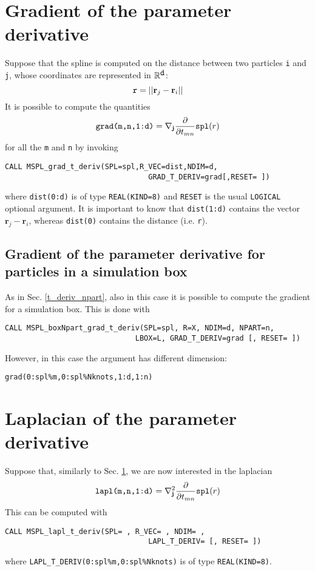 \documentclass[11pt,a4paper,twoside]{article}
\begin{document}
\section{Gradient of the parameter derivative}
\label{gradient}
Suppose that the spline is computed on the distance between two particles \verb+i+ and \verb+j+, whose coordinates are represented in $\mathbb{R}^{\verb!d!}$:
$$
\verb!r! = || \mathbf{r}_j - \mathbf{r}_i ||
$$
It is possible to compute the quantities
$$
\verb!grad(m,n,1:d)! = \nabla_{\mathbf{j}} \frac{\partial}{\partial t_{mn}} \verb!spl!(r)
$$
for all the \verb+m+ and \verb+n+ by invoking
\begin{verbatim}
CALL MSPL_grad_t_deriv(SPL=spl,R_VEC=dist,NDIM=d,
                                 GRAD_T_DERIV=grad[,RESET= ])
\end{verbatim}
where \verb+dist(0:d)+ is of type \verb+REAL(KIND=8)+ and \verb+RESET+ is the usual \verb+LOGICAL+ optional argument.
It is important to know that \verb+dist(1:d)+ contains the vector $\mathbf{r}_j - \mathbf{r}_i$, whereas \verb+dist(0)+ contains the distance (i.e. \verb+r+).

\subsection{Gradient of the parameter derivative for particles in a simulation box}
\label{gradient_npart}
As in Sec. \ref{t_deriv_npart}, also in this case it is possible to compute the gradient for a simulation box.
This is done with
\begin{verbatim}
CALL MSPL_boxNpart_grad_t_deriv(SPL=spl, R=X, NDIM=d, NPART=n,
                              LBOX=L, GRAD_T_DERIV=grad [, RESET= ])
\end{verbatim}
However, in this case the argument has different dimension:
\begin{verbatim}
grad(0:spl%m,0:spl%Nknots,1:d,1:n)
\end{verbatim}

\section{Laplacian of the parameter derivative}
\label{laplacian}
Suppose that, similarly to Sec. \ref{gradient}, we are now interested in the laplacian
$$
\verb!lapl(m,n,1:d)! = \nabla^2_{\mathbf{j}} \frac{\partial}{\partial t_{mn}} \verb!spl!(r)
$$
This can be computed with
\begin{verbatim}
CALL MSPL_lapl_t_deriv(SPL= , R_VEC= , NDIM= , 
                                 LAPL_T_DERIV= [, RESET= ])
\end{verbatim}
where \verb+LAPL_T_DERIV(0:spl%m,0:spl%Nknots)+ is of type \verb+REAL(KIND=8)+.
\end{document}

